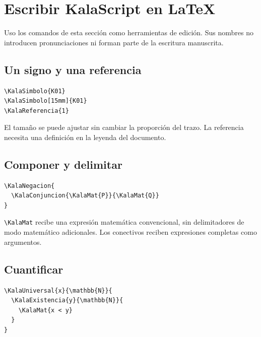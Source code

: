 \section{Escribir KalaScript en LaTeX}

Uso los comandos de esta sección como herramientas de edición. Sus nombres no
introducen pronunciaciones ni forman parte de la escritura manuscrita.

\subsection{Un signo y una referencia}

\begin{Verbatim}[fontsize=\small,frame=single]
\KalaSimbolo{K01}
\KalaSimbolo[15mm]{K01}
\KalaReferencia{1}
\end{Verbatim}


El tamaño se puede ajustar sin cambiar la proporción del trazo. La referencia
necesita una definición en la leyenda del documento.

\subsection{Componer y delimitar}

\begin{Verbatim}[fontsize=\small,frame=single]
\KalaNegacion{
  \KalaConjuncion{\KalaMat{P}}{\KalaMat{Q}}
}
\end{Verbatim}


\texttt{\textbackslash KalaMat} recibe una expresión matemática convencional,
sin delimitadores de modo matemático adicionales. Los conectivos reciben
expresiones completas como argumentos.

\subsection{Cuantificar}

\begin{Verbatim}[fontsize=\small,frame=single]
\KalaUniversal{x}{\mathbb{N}}{
  \KalaExistencia{y}{\mathbb{N}}{
    \KalaMat{x < y}
  }
}
\end{Verbatim}


